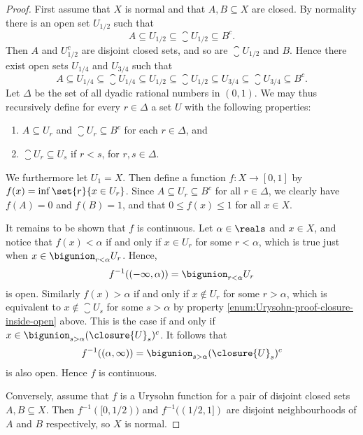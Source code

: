 \documentclass[article, a4paper, 11pt, oneside]{memoir}
\numberwithin{equation}{chapter}
\newcommand{\preim}{^{-1}}
\begin{document}
\begin{proof}
    First assume that $X$ is normal and that $A,B \subseteq X$ are closed. By normality there is an open set $U_{1/2}$ such that
    \begin{equation*}
        A
            \subseteq U_{1/2}
            \subseteq \closure{U}_{\!1/2}
            \subseteq B^c.
    \end{equation*}
    Then $A$ and $U_{1/2}^c$ are disjoint closed sets, and so are $\closure{U}_{\!1/2}$ and $B$. Hence there exist open sets $U_{1/4}$ and $U_{3/4}$ such that
    \begin{equation*}
        A
            \subseteq U_{1/4}
            \subseteq \closure{U}_{\!1/4}
            \subseteq U_{1/2}
            \subseteq \closure{U}_{\!1/2}
            \subseteq U_{3/4}
            \subseteq \closure{U}_{\!3/4}
            \subseteq B^c.
    \end{equation*}
    Let $\Delta$ be the set of all dyadic rational numbers in $(0,1)$. We may thus recursively define for every $r \in \Delta$ a set $U$ with the following properties:
    \begin{enumerate} %
        \item $A \subseteq U_r$ and $\closure{U}_r \subseteq B^c$ for each $r \in \Delta$, and

        \item \label{enum:Urysohn-proof-closure-inside-open} $\closure{U}_r \subseteq U_s$ if $r < s$, for $r,s \in \Delta$.
    \end{enumerate}
    We furthermore let $U_1 = X$. Then define a function $f \colon X \to [0,1]$ by $f(x) = \inf \set{r}{x \in U_r}$. Since $A \subseteq U_r \subseteq B^c$ for all $r \in \Delta$, we clearly have $f(A) = 0$ and $f(B) = 1$, and that $0 \leq f(x) \leq 1$ for all $x \in X$.

    It remains to be shown that $f$ is continuous. Let $\alpha \in \reals$ and $x \in X$, and notice that $f(x) < \alpha$ if and only if $x \in U_r$ for some $r < \alpha$, which is true just when $x \in \bigunion_{r < \alpha} U_r$. Hence,
    \begin{equation*}
        f\preim((-\infty,\alpha))
            = \bigunion_{r < \alpha} U_r
    \end{equation*}
    is open. Similarly $f(x) > \alpha$ if and only if $x \not\in U_r$ for some $r > \alpha$, which is equivalent to $x \not\in \closure{U}_s$ for some $s > \alpha$ by property \cref{enum:Urysohn-proof-closure-inside-open} above. This is the case if and only if $x \in \bigunion_{s > \alpha} (\closure{U}_s)^c$. It follows that
    \begin{equation*}
        f\preim((\alpha,\infty))
            = \bigunion_{s > \alpha} (\closure{U}_s)^c
    \end{equation*}
    is also open. Hence $f$ is continuous.

    Conversely, assume that $f$ is a Urysohn function for a pair of disjoint closed sets $A,B \subseteq X$. Then $f\preim([0,1/2))$ and $f\preim((1/2,1])$ are disjoint neighbourhoods of $A$ and $B$ respectively, so $X$ is normal.
\end{proof}




\end{document}
